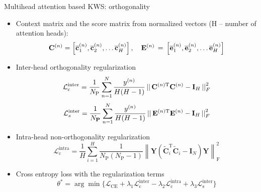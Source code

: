 \begin{frame}{Multihead attention based KWS: orthogonality}
    \begin{itemize}
        \item Context matrix and the score matrix from normalized vectors (H -- number of attention heads):
        $${\bf C}^{(n)}=\left[{\overline{{{\bf c}}}}_{1}^{(n)},{\overline{{{{\bf c}}}}}_{2}^{(n)},\dots{\overline{{{{\bf c}}}}}_{H}^{(n)}\right],
        ~~~ \mathbf{E}^{(n)}\,=\,\left[\overline{{{\mathbf{e}}}}_{1}^{(n)},\overline{{{\mathbf{e}}}}_{2}^{(n)},\ldots\mathbf{\bf\overline{e}}_{H}^{(n)}\right]$$
    
        \item Inter-head orthogonality regularization
    $${{\mathcal{L}}_{\mathrm{c}}^{\mathrm{inter}}=\frac{1}{N_{\mathrm{P}}}\sum_{n=1}^{N}\frac{y^{(n)}}{H(H-1)}\left|\right|{\bf C}^{(n)\mathrm{T}}{\bf C}^{(n)}-{\bf I}_{H}\left|\right|_{F}^{2}}$$
    $${\mathcal{L}}_{s}^{\mathrm{inter}}=\frac{1}{N_{\bf P}}\sum_{n=1}^{N}\frac{y^{(n)}}{H(H-1)}\left|\right|{\bf E}^{(n)\mathrm{T}}{\bf E}^{(n)}-{\bf I}_{H}\left|\right|_{F}^{2}$$
    
    \item Intra-head non-orthogonality regularization
    $${\mathcal{L}}_{\mathrm{c}}^{\mathrm{intra}}={\frac{1}{H}}\sum_{i=1}^{H}{\frac{1}{N_{\mathrm{P}}(N_{\mathrm{P}}-1)}}\left\|\mathbf{Y}(\widetilde{\mathbf{C}}_{i}^{\mathrm{T}}\widetilde{\mathbf{C}}_{i}-\mathbf{I}_{N})\mathbf{Y}\right\|_{\mathrm{F}}^{2}$$
    
    \item Cross entropy loss with the regularization terms 
    $$\theta^{*}=\arg\operatorname*{min}\{\mathcal{L}_{\mathrm{CE}}+\lambda_{1}{\mathcal{L}}_{\mathrm{c}}^{\mathrm{inter}}-\lambda_{2}{\mathcal{L}}_{\mathrm{c}}^{\mathrm{intra}}+\lambda_{3}{\mathcal{L}}_{\mathrm{s}}^{\mathrm{inter}}\}$$
    \end{itemize}
    
\end{frame}
